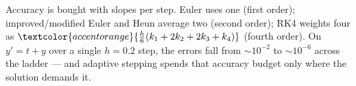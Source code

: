 \vspace{0.8em}
\begin{conceptbox}
Accuracy is bought with slopes per step. \textcolor{accentorange}{Euler} uses one
(first order); \textcolor{accentorange}{improved/modified Euler and Heun} average
two (second order); \textcolor{accentorange}{RK4} weights four as
$\textcolor{accentorange}{\tfrac{h}{6}(k_1+2k_2+2k_3+k_4)}$ (fourth order). On
$y'=t+y$ over a single $h=0.2$ step, the errors fall from $\sim 10^{-2}$ to
$\sim 10^{-6}$ across the ladder --- and \textcolor{accentorange}{adaptive stepping}
spends that accuracy budget only where the solution demands it.
\end{conceptbox}



